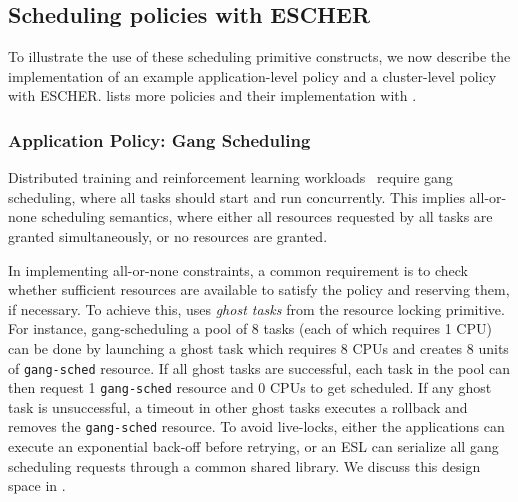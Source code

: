 
\subsection{Scheduling policies with ESCHER}
\label{policies:gangsched}
\label{sec:sched:policies}
To illustrate the use of these scheduling primitive constructs, we now describe the implementation of an example application-level policy and a cluster-level policy with ESCHER.  lists more policies and their implementation with \name{}.

\subsubsection{Application Policy: Gang Scheduling}
Distributed training \cite{gandiva} and reinforcement learning workloads~\cite{gorila} require gang scheduling, where all tasks should start and run concurrently. This implies all-or-none scheduling semantics, where either all resources requested by all tasks are granted simultaneously, or no resources are granted.

In implementing all-or-none constraints, a common requirement is to check whether sufficient resources are available to satisfy the policy and reserving them, if necessary.
To achieve this, \name{} uses \textit{ghost tasks} from the resource locking primitive. 
For instance, gang-scheduling a pool of 8 tasks (each of which requires 1 CPU) can be done by launching a ghost task which requires 8 CPUs and creates 8 units of \lstinline{gang-sched} resource. If all ghost tasks are successful, each task in the pool can then request 1 \lstinline{gang-sched} resource and 0 CPUs to get scheduled. If any ghost task is unsuccessful, a timeout in other ghost tasks executes a rollback and removes the \lstinline{gang-sched} resource. To avoid live-locks, either the applications can execute an exponential back-off \cite{expbackoff} before retrying, or an ESL can serialize all gang scheduling requests through a common shared library. We discuss this design space in .

